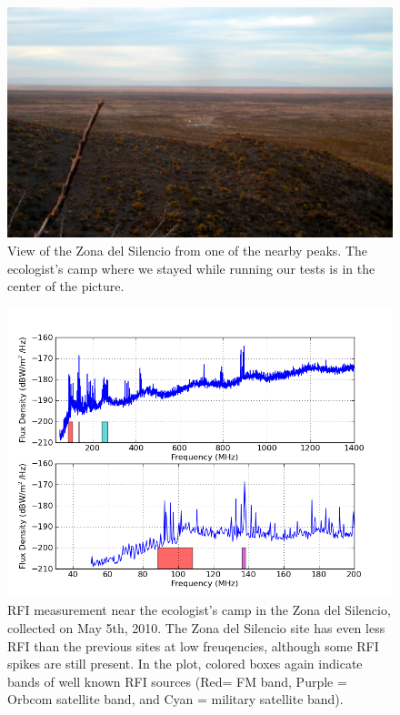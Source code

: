 \begin{figure}[htb]
\begin{center}
\includegraphics[width=0.9\linewidth]{RFI_testing/figures/zds_overview_shot.jpg}
\caption{View of the Zona del Silencio from one of the nearby peaks. The ecologist's camp where we stayed while running our tests is in the center of the picture.}
\label{Fig:zdsover}
\end{center}
\end{figure}

\begin{figure}[htb]
\begin{center}
\includegraphics[width=0.9\linewidth]{RFI_testing/figures/ZdS_halfway_in_bands.png}
\caption{RFI measurement near the ecologist's camp in the Zona del Silencio, collected on May 5th, 2010. The Zona del Silencio site has even less RFI than the previous sites at low freuqencies, although some RFI spikes are still present. In the plot, colored boxes again indicate bands of well known RFI sources (Red= FM band, Purple = Orbcom satellite band, and Cyan = military satellite band).}
\label{Fig:zdsendrfi}
\end{center}
\end{figure}



